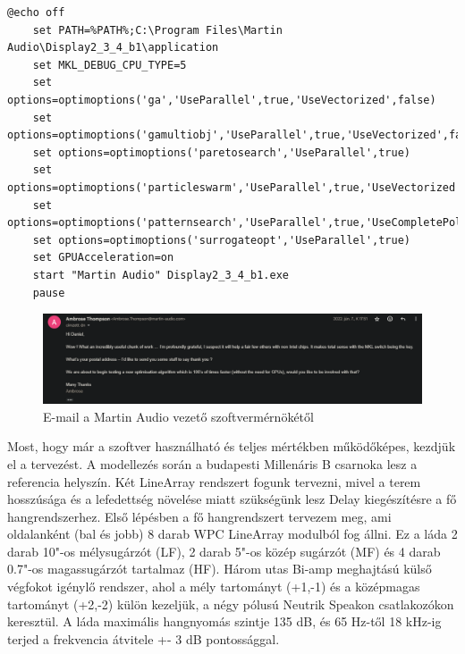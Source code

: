\begin{lstlisting}[caption={A Display 2.3.4 b1 indító ".bat" scriptje AMD Ryzen processzorokhoz}, label=batcode, xleftmargin=\parindent]
    @echo off
    set PATH=%PATH%;C:\Program Files\Martin Audio\Display2_3_4_b1\application
    set MKL_DEBUG_CPU_TYPE=5
    set options=optimoptions('ga','UseParallel',true,'UseVectorized',false)
    set options=optimoptions('gamultiobj','UseParallel',true,'UseVectorized',false)
    set options=optimoptions('paretosearch','UseParallel',true)
    set options=optimoptions('particleswarm','UseParallel',true,'UseVectorized',false)
    set options=optimoptions('patternsearch','UseParallel',true,'UseCompletePoll',true,'UseVectorized',false)
    set options=optimoptions('surrogateopt','UseParallel',true)
    set GPUAcceleration=on
    start "Martin Audio" Display2_3_4_b1.exe
    pause
\end{lstlisting}
\begin{figure}[H]
	\centering
	\includegraphics[width=\textwidth, keepaspectratio]{figures/ambrose_email.png}
	\caption{E-mail a Martin Audio vezető szoftvermérnökétől}
	\label{fig:ambrose_email}
\end{figure}
Most, hogy már a szoftver használható és teljes mértékben működőképes, kezdjük el a tervezést.
A modellezés során a budapesti Millenáris B csarnoka lesz a referencia helyszín. Két LineArray rendszert fogunk
tervezni, mivel a terem hosszúsága és a lefedettség növelése miatt szükségünk lesz Delay kiegészítésre a fő hangrendszerhez.
Első lépésben a fő hangrendszert tervezem meg, ami oldalanként (bal és jobb) 8 darab WPC LineArray modulból fog állni.
Ez a láda 2 darab 10"-os mélysugárzót (LF), 2 darab 5"-os közép sugárzót (MF) és 4 darab 0.7"-os magassugárzót tartalmaz (HF).
Három utas Bi-amp meghajtású külső végfokot igénylő rendszer, ahol a mély tartományt (+1,-1) és a középmagas tartományt (+2,-2) külön kezeljük,
a négy pólusú Neutrik Speakon csatlakozókon keresztül.
A láda maximális hangnyomás szintje 135 dB, és 65 Hz-től 18 kHz-ig terjed a frekvencia átvitele +- 3 dB pontossággal. \cite{WPCUSERGUIDE}
